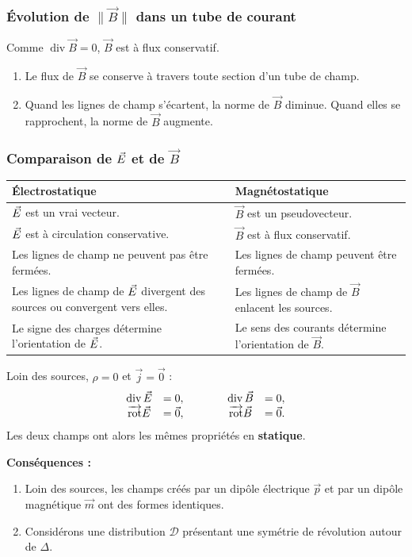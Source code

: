 \documentclass[11pt,a4paper]{article}
\newcommand{\vj}{\vec j}\newcommand{\vE}{\vec E}\newcommand{\vB}{\vec B}
\newcommand{\divg}{\operatorname{div}}\newcommand{\sy}{\operatorname{sym}}
\newcommand{\D}{\mathcal D}\newcommand{\R}{\mathcal R}
\newcommand{\vzero}{\vec 0}
\newcommand{\B}{\vec B}\newcommand{\A}{\vec A}
\newcommand{\vm}{\vec m}\newcommand{\mM}{\vec{\mathcal M}}
\newcommand{\petittitre}[1]{\par\nopagebreak[2]\textbf{#1}\par\nopagebreak[4]}
\newcommand{\flignes}{\begin{enumerate}[label=\arabic*.]
\item Le flux de \(\B\) se conserve à travers toute section d'un tube de champ.
\item Quand les lignes de champ s'écartent, la norme de \(\B\) diminue. Quand elles se rapprochent, la norme de \(\B\) augmente.
\end{enumerate}}
\begin{document}
\subsubsection{\texorpdfstring{Évolution de \(\lVert\B\rVert\) dans un tube de courant}{Évolution de la norme de B dans un tube de courant}}\label{s:tube}
Comme \(\divg\B=0\), \(\B\) est à flux conservatif.
\begin{cadre}\flignes\end{cadre}

\subsubsection{\texorpdfstring{Comparaison de \(\vec E\) et de \(\B\)}{Comparaison de E et de B}}\label{s:compar}
\begin{center}
\renewcommand{\arraystretch}{1.65}\begin{tabularx}{.96\linewidth}{@{}X|X@{}}
\textbf{Électrostatique} & \textbf{Magnétostatique}\\\hline
\(\vec E\) est un vrai vecteur. & \(\B\) est un pseudovecteur.\\\hline
\(\vec E\) est à circulation conservative. & \(\B\) est à flux conservatif.\\\hline
Les lignes de champ ne peuvent pas être fermées. & Les lignes de champ peuvent être fermées.\\\hline
Les lignes de champ de \(\vec E\) divergent des sources ou convergent vers elles. & Les lignes de champ de \(\B\) enlacent les sources.\\\hline
Le signe des charges détermine l'orientation de \(\vec E\). & Le sens des courants détermine l'orientation de \(\B\).
\end{tabularx}\end{center}
Loin des sources, \(\rho=0\) et \(\vj=\vzero\) :
\[
 \begin{array}{cc@{\qquad\qquad}cc}
 \divg\E&=0,&\divg\B&=0,\\
 \rot\E&=\vzero,&\rot\B&=\vzero.
 \end{array}
\]
Les deux champs ont alors les mêmes propriétés en \textbf{statique}.
\petittitre{Conséquences :}
\begin{enumerate}[label=\arabic*.]
\item Loin des sources, les champs créés par un dipôle électrique \(\vec p\) et par un dipôle magnétique \(\vm\) ont des formes identiques.
\item Considérons une distribution \(\D\) présentant une symétrie de révolution autour de \(\Delta\).
\end{enumerate}
\end{document}
